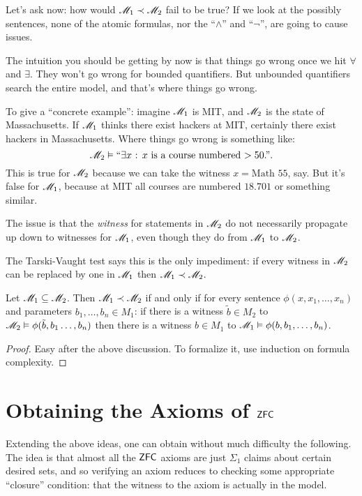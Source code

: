 Let's ask now: how would $\mathscr M_1 \prec \mathscr M_2$ fail to be true?
If we look at the possibly sentences, none of the atomic formulas,
nor the ``$\land$'' and ``$\neg$'', are going to cause issues.

The intuition you should be getting by now is that things go
wrong once we hit $\forall$ and $\exists$.
They won't go wrong for bounded quantifiers.
But unbounded quantifiers search the entire model, and that's where things go wrong.

To give a ``concrete example'':
imagine $\mathscr M_1$ is MIT, and $\mathscr M_2$ is the state of Massachusetts.
If $\mathscr M_1$ thinks there exist hackers at MIT,
certainly there exist hackers in Massachusetts.
Where things go wrong is something like:
\[ \mathscr M_2 \vDash \text{``$\exists x$ : $x$ is a course numbered $> 50$.''}. \]
This is true for $\mathscr M_2$ because we can take the witness $x = \text{Math 55}$, say.
But it's false for $\mathscr M_1$, because at MIT all courses are numbered $18.701$ or something similar.
\begin{moral}
	The issue is that the \emph{witness}
	for statements in $\mathscr M_2$ do not necessarily propagate up
	down to witnesses for $\mathscr M_1$, even though they do from $\mathscr M_1$ to $\mathscr M_2$.
\end{moral}

The Tarski-Vaught test says this is the only impediment:
if every witness in $\mathscr M_2$ can be replaced by one in $\mathscr M_1$ then $\mathscr M_1 \prec \mathscr M_2$.
\begin{lemma}
	Let $\mathscr M_1 \subseteq \mathscr M_2$.
	Then $\mathscr M_1 \prec \mathscr M_2$ if and only if for
	every sentence $\phi(x, x_1, \dots, x_n)$ and parameters $b_1, \dots, b_n \in M_1$:
	if there is a witness $\tilde b \in M_2$ to $\mathscr M_2 \vDash \phi(\tilde b, b_1 \dots, b_n)$
	then there is a witness $b \in M_1$ to $\mathscr M_1 \vDash \phi(b, b_1, \dots, b_n)$.
\end{lemma}
\begin{proof}
	Easy after the above discussion.
	To formalize it, use induction on formula complexity.
\end{proof}

\section{Obtaining the Axioms of $\mathsf{ZFC}$}
Extending the above ideas, one can obtain without much difficulty the following.
The idea is that almost all the $\mathsf{ZFC}$ axioms are just $\Sigma_1$ claims about certain desired sets,
and so verifying an axiom reduces to checking some appropriate ``closure'' condition:
that the witness to the axiom is actually in the model.

